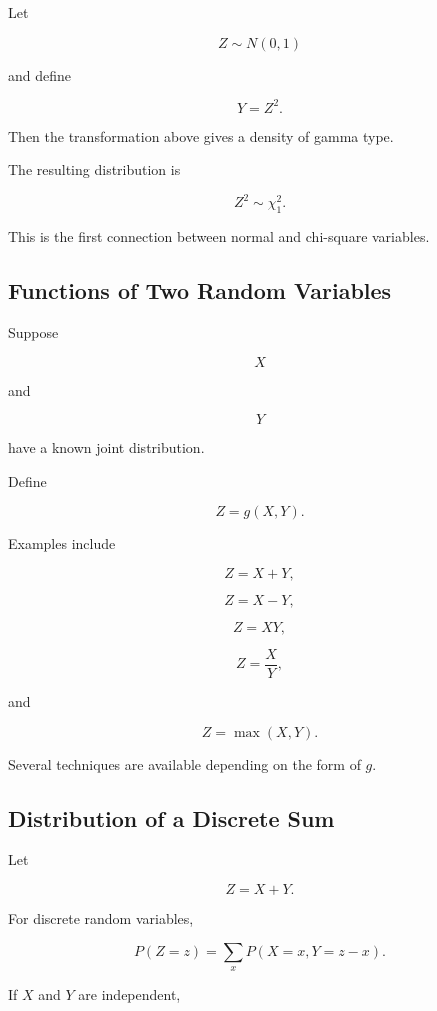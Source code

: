 Let

\[
Z\sim N(0,1)
\]

and define

\[
Y=Z^2.
\]

Then the transformation above gives a density of gamma type.

The resulting distribution is

\[
\boxed{
Z^2
\sim
\chi^2_1.
}
\]

This is the first connection between normal and chi-square variables.

\subsection{Functions of Two Random Variables}
\label{subsec:functions-two-random-variables-full}

Suppose

\[
X
\]

and

\[
Y
\]

have a known joint distribution.

Define

\[
\boxed{
Z=g(X,Y).
}
\]

Examples include

\[
Z=X+Y,
\]

\[
Z=X-Y,
\]

\[
Z=XY,
\]

\[
Z=\frac{X}{Y},
\]

and

\[
Z=\max(X,Y).
\]

Several techniques are available depending on the form of \(g\).

\subsection{Distribution of a Discrete Sum}
\label{subsec:discrete-sum-convolution}

Let

\[
Z=X+Y.
\]

For discrete random variables,

\[
\boxed{
P(Z=z)
=
\sum_x
P(X=x,Y=z-x).
}
\]

If \(X\) and \(Y\) are independent,

